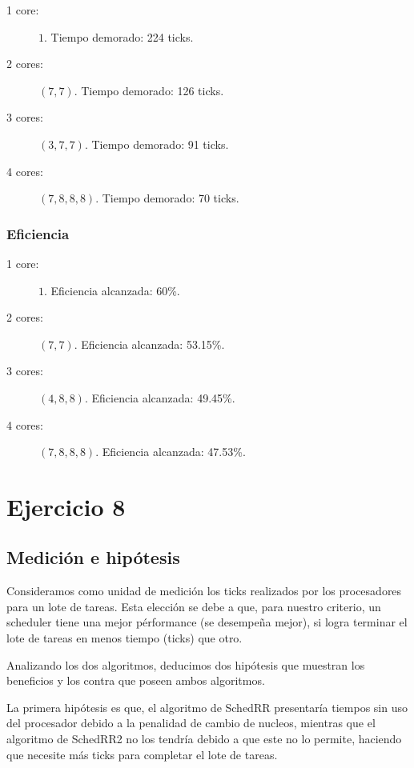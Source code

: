 \documentclass[a4paper,10pt,twoside]{article}
\begin{document}
\begin{description}
	\item[1 core:] $1$.             Tiempo demorado: 224 ticks.
	\item[2 cores:] $(7, 7)$.       Tiempo demorado: 126 ticks.
	\item[3 cores:] $(3, 7, 7)$.    Tiempo demorado: 91 ticks.
	\item[4 cores:] $(7, 8, 8, 8)$. Tiempo demorado: 70 ticks.
\end{description}


\subsubsection{Eficiencia}

\begin{description}
	\item[1 core:] $1$.             Eficiencia alcanzada: 60\%.
	\item[2 cores:] $(7, 7)$.       Eficiencia alcanzada: 53.15\%.
	\item[3 cores:] $(4, 8, 8)$.    Eficiencia alcanzada: 49.45\%.
	\item[4 cores:] $(7, 8, 8, 8)$. Eficiencia alcanzada: 47.53\%.
\end{description}




\section{Ejercicio 8}

\subsection{Medición e hipótesis}
Consideramos como unidad de medición los ticks realizados por los procesadores para un lote de tareas. Esta elección se debe a que, para nuestro criterio, un scheduler tiene una mejor pérformance (se desempeña mejor), si logra terminar el lote de tareas en menos tiempo (ticks) que otro.

Analizando los dos algoritmos, deducimos dos hipótesis que muestran los beneficios y los contra que poseen ambos algoritmos.

La primera hipótesis es que, el algoritmo de SchedRR presentaría tiempos sin uso del procesador debido a la penalidad de cambio de nucleos, mientras que el algoritmo de SchedRR2 no los tendría debido a que este no lo permite, haciendo que necesite más ticks para completar el lote de tareas.
\end{document}
